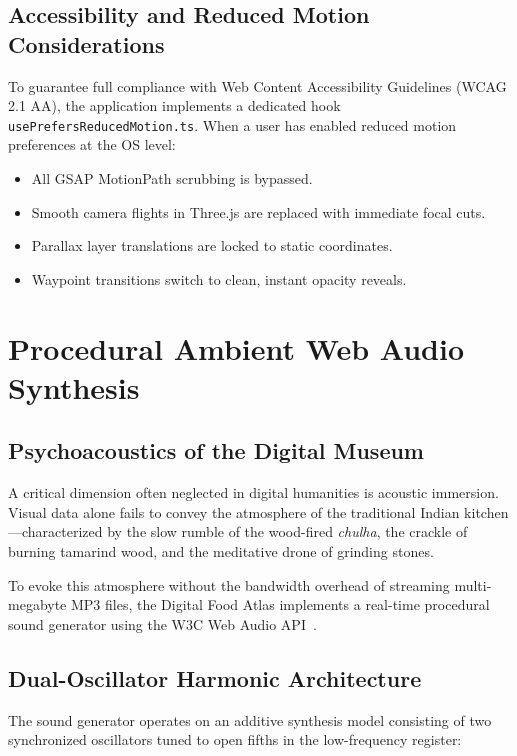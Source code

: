 \documentclass[11pt,a4paper]{report}
\begin{document}
\section{Accessibility and Reduced Motion Considerations}
To guarantee full compliance with Web Content Accessibility Guidelines (WCAG 2.1 AA), the application implements a dedicated hook \texttt{usePrefersReducedMotion.ts}. When a user has enabled reduced motion preferences at the OS level:
\begin{itemize}
    \item All GSAP MotionPath scrubbing is bypassed.
    \item Smooth camera flights in Three.js are replaced with immediate focal cuts.
    \item Parallax layer translations are locked to static coordinates.
    \item Waypoint transitions switch to clean, instant opacity reveals.
\end{itemize}

\chapter{Procedural Ambient Web Audio Synthesis}

\section{Psychoacoustics of the Digital Museum}
A critical dimension often neglected in digital humanities is acoustic immersion. Visual data alone fails to convey the atmosphere of the traditional Indian kitchen---characterized by the slow rumble of the wood-fired \emph{chulha}, the crackle of burning tamarind wood, and the meditative drone of grinding stones. 

To evoke this atmosphere without the bandwidth overhead of streaming multi-megabyte MP3 files, the Digital Food Atlas implements a real-time procedural sound generator using the W3C Web Audio API~\cite{webaudioapi2021}.

\section{Dual-Oscillator Harmonic Architecture}
The sound generator operates on an additive synthesis model consisting of two synchronized oscillators tuned to open fifths in the low-frequency register:
\end{document}
